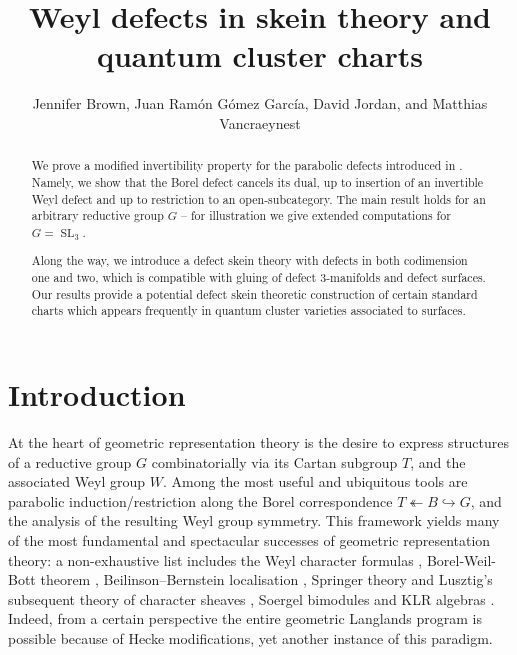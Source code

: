 \documentclass[a4paper]{article}
\title{Weyl defects in skein theory and quantum cluster charts}
\author{\parbox{\textwidth}{\centering Jennifer Brown, Juan Ramón Gómez García, David Jordan, and Matthias Vancraeynest}}
\numberwithin{equation}{section}
\newcommand{\1}{{\mathrm{1}\mkern-4mu{\mathchoice{}{}{\mskip-0.5mu}{\mskip-1mu}}\mathrm{l}}}
\DeclareMathOperator{\SL}{SL}
\begin{document}
\maketitle

\begin{abstract}

    We prove a modified invertibility property for the parabolic defects introduced in \cite{JLSS2021,Brown_Jordan_2025}. Namely, we show that the Borel defect cancels its dual, up to insertion of an invertible Weyl defect and up to restriction to an open-subcategory.  The main result holds for an arbitrary reductive group $G$ -- for illustration we give extended computations for $G=\SL_3$.
    
    Along the way, we introduce a defect skein theory with defects in both codimension one and two, which is compatible with gluing of defect 3-manifolds and defect surfaces.  Our results provide a potential defect skein theoretic construction of certain standard charts which appears frequently in quantum cluster varieties associated to surfaces.
\end{abstract}

\tableofcontents
\section{Introduction}

At the heart of geometric representation theory is the desire to express structures of a reductive group $G$ combinatorially via its Cartan subgroup $T$, and the associated Weyl group $W$.  Among the most useful and ubiquitous tools are parabolic induction/restriction along the Borel correspondence $T\twoheadleftarrow B\hookrightarrow G$, and the analysis of the resulting Weyl group symmetry.  This framework yields many of the most fundamental and spectacular successes of geometric representation theory:  a non-exhaustive list includes the Weyl character formulas \cite{Weyl1925,Weyl1926}, Borel-Weil-Bott theorem \cite{serre1954representations,bott1957homogeneous}, Beilinson--Bernstein localisation \cite{BeilinsonBernstein1981,Beilinson1983}, Springer theory \cite{Springer1976,Springer1978} and Lusztig's subsequent theory of character sheaves \cite{Lusztig1985a,Lusztig1985b,Lusztig1986a,Lusztig1986b}, Soergel bimodules \cite{soergel2007kazhdan,soergel1990kategorie} and KLR algebras \cite{Rouquier2008,KhovanovLauda2010,KhovanovLauda2011}. Indeed, from a certain perspective the entire geometric Langlands program is possible because of Hecke modifications, yet another instance of this paradigm. 
\end{document}
